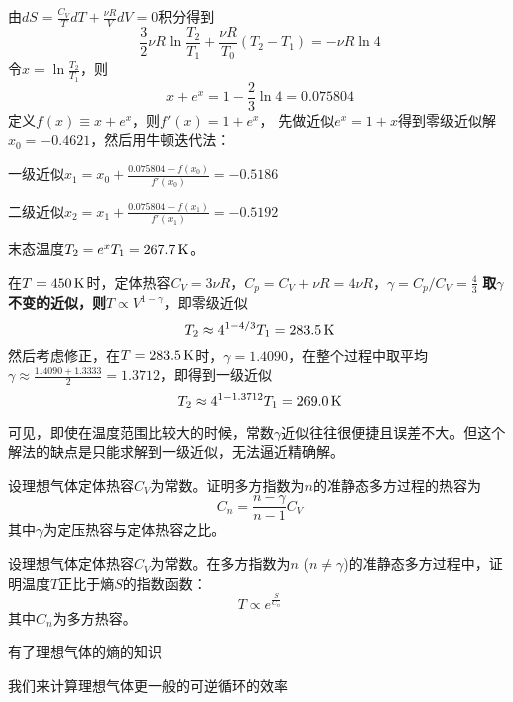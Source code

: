 \documentclass[CJK]{beamer}
\begin{document}
\begin{frame}
\bch
{\scriptsize
由$ dS = \frac{C_V}{T}dT + \frac{\nu R}{V}dV = 0$积分得到
$$\frac{3}{2} \nu R \ln \frac{T_2}{T_1} +\frac{\nu R}{T_0}\left(T_2-T_1\right) = -\nu R \ln 4 $$
令$x = \ln \frac{T_2}{T_1}$，则
$$  x + e^x = 1-\frac{2}{3} \ln 4 = 0.075804 $$
定义$f(x) \equiv x+e^x$，则$f'(x) = 1+e^x$，
先做近似$e^x = 1+x$得到零级近似解$x_0 =-0.4621 $，然后用牛顿迭代法：

一级近似$x_1 = x_0 + \frac{0.075804 - f(x_0)}{f'(x_0)} = -0.5186 $

二级近似$x_2 = x_1 + \frac{0.075804- f(x_1)}{f'(x_1)} = -0.5192 $

末态温度$T_2 = e^x T_1 = 267.7 \,\mathrm{K}$。
 }
\ech
\end{frame}

\begin{frame}
\bch
{\scriptsize
在$T=450\,\mathrm{K}$时，定体热容$C_V = 3 \nu R$，$C_p = C_V+\nu R = 4\nu R$，$\gamma = C_p/C_V = \frac{4}{3}$
{\bf 取$\gamma$不变的近似，则$T \propto V^{1-\gamma}$}，即零级近似
$$T_2 \approx 4^{1-4/3} T_1 = 283.5 \,\mathrm{K}$$
然后考虑修正，在$T=283.5\,\mathrm{K}$时，$\gamma = 1.4090$，在整个过程中取平均$\gamma \approx \frac{1.4090+1.3333}{2} = 1.3712$，即得到一级近似
$$ T_2 \approx 4^{1-1.3712} T_1 = 269.0 \,\mathrm{K}$$

\skiplines

可见，即使在温度范围比较大的时候，常数$\gamma$近似往往很便捷且误差不大。但这个解法的缺点是只能求解到一级近似，无法逼近精确解。
 }
\ech
\end{frame}

\begin{frame}
\bch
{}
设理想气体定体热容$C_V$为常数。证明多方指数为$n$的准静态多方过程的热容为
$$C_n = \frac{n-\gamma}{n-1} C_V$$
其中$\gamma$为定压热容与定体热容之比。
\ech
\end{frame}



\begin{frame}
\bch
{}
设理想气体定体热容$C_V$为常数。在多方指数为$n$ ($n\ne \gamma$)的准静态多方过程中，证明温度$T$正比于熵$S$的指数函数：
{\blue $$T\propto e^{\frac{S}{C_n}}$$}
其中$C_n$为多方热容。
\ech
\end{frame}


\begin{frame}
\bch
有了理想气体的熵的知识


我们来计算理想气体更一般的可逆循环的效率
\ech
\end{frame}
\end{document}
